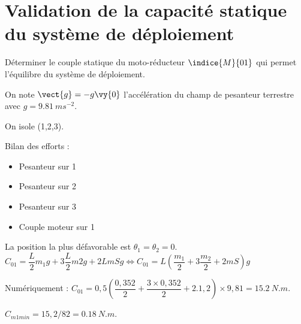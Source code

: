 \section{Validation de la capacité statique du système de déploiement}

\begin{obj}
Déterminer le couple statique du moto-réducteur $\indice{M}{01}$ qui permet l’équilibre du système de déploiement.
\end{obj}

On note $\vect{g} = - g \vy{0}$ l'accélération du champ de pesanteur terrestre avec $g = \SI{9,81}{ms^{-2}}$.

\ifprof
\begin{corrige}%
On isole (1,2,3).

Bilan des efforts : 
\begin{itemize}
\item Pesanteur sur  1 
\item Pesanteur sur 2
\item Pesanteur sur 3
\item Couple moteur sur 1
\end{itemize}

La position la plus défavorable est $\theta_1=\theta_2=0$.
$C_{01}=\dfrac{L}{2} m_1g+3\dfrac{L}{2} m2g+2LmSg \Leftrightarrow C_{01}=L\left(\dfrac{m_1}{2}+3\dfrac{m_2}{2}+2mS\right)g$

Numériquement :
$C_{01}=0,5\left(\dfrac{0,352}{2}+\dfrac{3\times 0,352}{2}+2.1,2\right) \times 9,81=\SI{15,2}{N.m}$.

\end{corrige}
\else
\fi


\ifprof
\begin{corrige}%
$C_{m1 min}= 15,2/82 = \SI{0,18}{N.m}$.
\end{corrige}
\else
\fi
